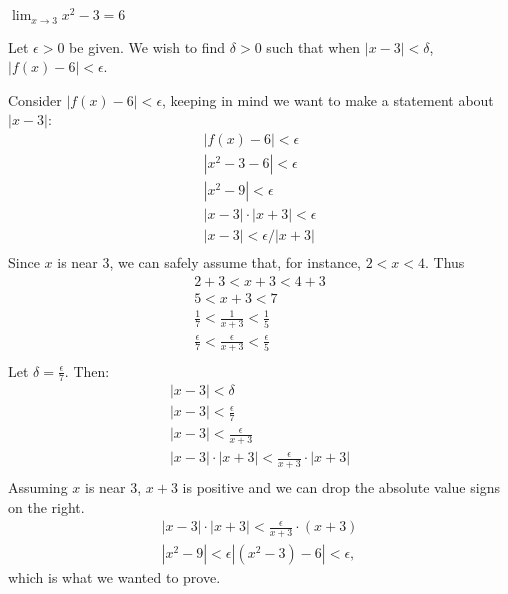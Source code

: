 {$\displaystyle \lim_{x\to 3} x^2-3 = 6$}
{Let $\epsilon >0$ be given. We wish to find $\delta >0$ such that when $|x-3|<\delta$, $|f(x)-6|<\epsilon$. 

Consider $|f(x)-6|<\epsilon$, keeping in  mind we want to make a statement about $|x-3|$:
\begin{gather*}
|f(x) -6 | < \epsilon \\
|x^2-3 -6 |<\epsilon \\
| x^2-9 | < \epsilon \\
| x-3 |\cdot|x+3| < \epsilon \\
| x-3 | < \epsilon/|x+3| \\
\end{gather*}
Since $x$ is near 3, we can safely assume that, for instance, $2<x<4$. Thus
\begin{gather*}
2+3<x+3<4+3 \\
5 < x+3 < 7 \\
\frac{1}{7} < \frac{1}{x+3} < \frac{1}{5} \\
\frac{\epsilon}{7} < \frac{\epsilon}{x+3} < \frac{\epsilon}{5} \\
\end{gather*}
Let $\delta =\frac{\epsilon}{7}$. Then:
\begin{gather*}
|x-3|<\delta \\
|x-3| < \frac{\epsilon}7\\
|x-3| < \frac{\epsilon}{x+3}\\
|x-3|\cdot|x+3| < \frac{\epsilon}{x+3}\cdot|x+3|\\
\end{gather*}
Assuming $x$ is near 3, $x+3$ is positive and we can drop the absolute value signs on the right.
\begin{gather*}
|x-3|\cdot|x+3| < \frac{\epsilon}{x+3}\cdot(x+3)\\
|x^2-9| < \epsilon
|(x^2-3) - 6| < \epsilon,
\end{gather*}
which is what we wanted to prove.
}



